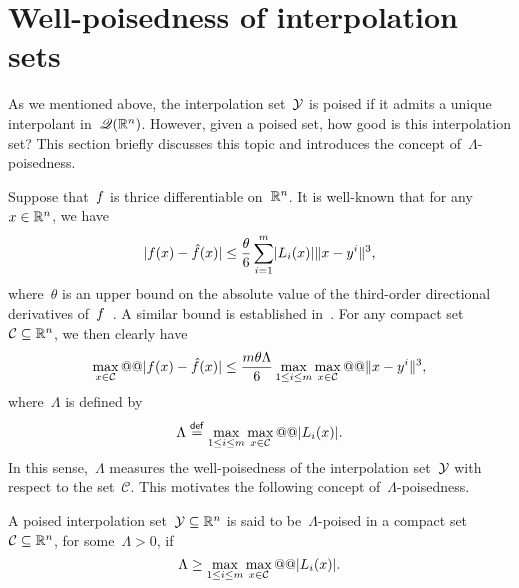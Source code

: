 \section{Well-poisedness of interpolation sets}
\label{sec:poisedness}

As we mentioned above, the interpolation set~$\xpt$ is poised if it admits a unique interpolant in~$\mathscr{Q}(\mathbb{R}^n)$.
However, given a poised set, how good is this interpolation set?
This section briefly discusses this topic and introduces the concept of~$\Lambda$-poisedness.

Suppose that~$f$ is thrice differentiable on~$\mathbb{R}^n$.
It is well-known that for any~$\iter \in \R^n$, we have
\begin{equation}
    \label{eq:Ciarlet_Raviart_0}
    \abs{\obj(\iter) - \objm(\iter)} \le \frac{\theta}{6} \sum_{i = 1}^m \abs{\lagp[i](\iter)} \norm{x - y^i}^3,
\end{equation}
where~$\theta$ is an upper bound on the absolute value of the third-order directional derivatives of~$f$~\cite[Thm.~2]{Powell_2001}.
A similar bound is established in~\cite[Thm.~2]{Ciarlet_Raviart_1972}.
For any compact set~$\mathcal{C} \subseteq \mathbb{R}^n$, we then clearly have
\begin{equation}
    \label{eq:ciarlet-raviard-bound}
    \max_{\iter \in \mathcal{C}} @@ \abs{\obj(\iter) - \objm(\iter)} \le \frac{m \theta \Lambda}{6} \max_{1 \le i \le m} \max_{\iter \in \mathcal{C}} @@ \norm{x - y^i}^3,
\end{equation}
where~$\Lambda$ is defined by
\begin{equation}
    \label{eq:lambda-poisedness-convex-hull}
    \Lambda \eqdef \max_{1 \le i \le m} \max_{\iter \in \mathcal{C}} @@ \abs{\lagp[i](\iter)}.
\end{equation}
In this sense,~$\Lambda$ measures the well-poisedness of the interpolation set~$\xpt$ with respect to the set~$\mathcal{C}$.
This motivates the following concept of~$\Lambda$-poisedness.

\begin{definition}
    \label{def:lambda-poisedness}
    A poised interpolation set~$\xpt \subseteq \R^n$ is said to be~$\Lambda$-poised in a compact set~$\mathcal{C} \subseteq \mathbb{R}^n$, for some~$\Lambda > 0$, if
    \begin{equation*}
        \Lambda \ge \max_{1 \le i \le m} \max_{\iter \in \mathcal{C}} @@ \abs{\lagp[i](\iter)}.
    \end{equation*}
\end{definition}

